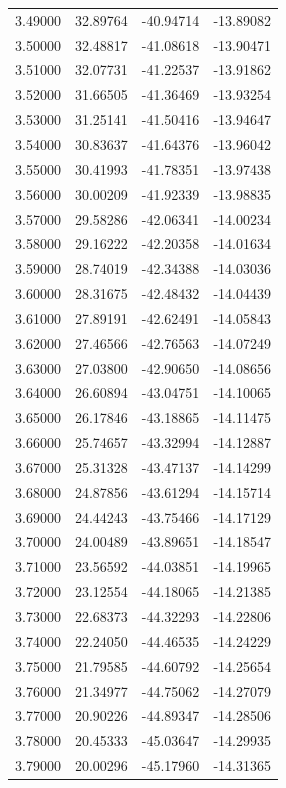 \begin{table}
\begin{tabular}{llll}
3.49000 & 32.89764 & -40.94714 & -13.89082 \\
3.50000 & 32.48817 & -41.08618 & -13.90471 \\
3.51000 & 32.07731 & -41.22537 & -13.91862 \\
3.52000 & 31.66505 & -41.36469 & -13.93254 \\
3.53000 & 31.25141 & -41.50416 & -13.94647 \\
3.54000 & 30.83637 & -41.64376 & -13.96042 \\
3.55000 & 30.41993 & -41.78351 & -13.97438 \\
3.56000 & 30.00209 & -41.92339 & -13.98835 \\
3.57000 & 29.58286 & -42.06341 & -14.00234 \\
3.58000 & 29.16222 & -42.20358 & -14.01634 \\
3.59000 & 28.74019 & -42.34388 & -14.03036 \\
3.60000 & 28.31675 & -42.48432 & -14.04439 \\
3.61000 & 27.89191 & -42.62491 & -14.05843 \\
3.62000 & 27.46566 & -42.76563 & -14.07249 \\
3.63000 & 27.03800 & -42.90650 & -14.08656 \\
3.64000 & 26.60894 & -43.04751 & -14.10065 \\
3.65000 & 26.17846 & -43.18865 & -14.11475 \\
3.66000 & 25.74657 & -43.32994 & -14.12887 \\
3.67000 & 25.31328 & -43.47137 & -14.14299 \\
3.68000 & 24.87856 & -43.61294 & -14.15714 \\
3.69000 & 24.44243 & -43.75466 & -14.17129 \\
3.70000 & 24.00489 & -43.89651 & -14.18547 \\
3.71000 & 23.56592 & -44.03851 & -14.19965 \\
3.72000 & 23.12554 & -44.18065 & -14.21385 \\
3.73000 & 22.68373 & -44.32293 & -14.22806 \\
3.74000 & 22.24050 & -44.46535 & -14.24229 \\
3.75000 & 21.79585 & -44.60792 & -14.25654 \\
3.76000 & 21.34977 & -44.75062 & -14.27079 \\
3.77000 & 20.90226 & -44.89347 & -14.28506 \\
3.78000 & 20.45333 & -45.03647 & -14.29935 \\
3.79000 & 20.00296 & -45.17960 & -14.31365 \\

\end{tabular}
\end{table}
